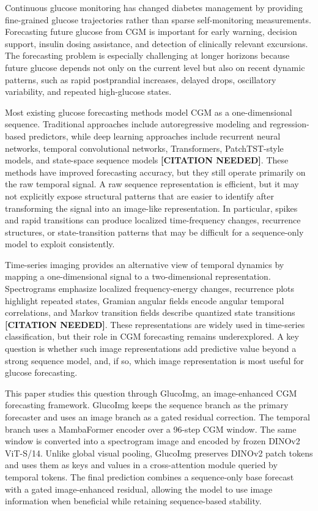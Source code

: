 \documentclass[11pt]{article}
\begin{document}
Continuous glucose monitoring has changed diabetes management by providing fine-grained glucose trajectories rather than sparse self-monitoring measurements. Forecasting future glucose from CGM is important for early warning, decision support, insulin dosing assistance, and detection of clinically relevant excursions. The forecasting problem is especially challenging at longer horizons because future glucose depends not only on the current level but also on recent dynamic patterns, such as rapid postprandial increases, delayed drops, oscillatory variability, and repeated high-glucose states.

Most existing glucose forecasting methods model CGM as a one-dimensional sequence. Traditional approaches include autoregressive modeling and regression-based predictors, while deep learning approaches include recurrent neural networks, temporal convolutional networks, Transformers, PatchTST-style models, and state-space sequence models \textbf{[CITATION NEEDED]}. These methods have improved forecasting accuracy, but they still operate primarily on the raw temporal signal. A raw sequence representation is efficient, but it may not explicitly expose structural patterns that are easier to identify after transforming the signal into an image-like representation. In particular, spikes and rapid transitions can produce localized time-frequency changes, recurrence structures, or state-transition patterns that may be difficult for a sequence-only model to exploit consistently.

Time-series imaging provides an alternative view of temporal dynamics by mapping a one-dimensional signal to a two-dimensional representation. Spectrograms emphasize localized frequency-energy changes, recurrence plots highlight repeated states, Gramian angular fields encode angular temporal correlations, and Markov transition fields describe quantized state transitions \textbf{[CITATION NEEDED]}. These representations are widely used in time-series classification, but their role in CGM forecasting remains underexplored. A key question is whether such image representations add predictive value beyond a strong sequence model, and, if so, which image representation is most useful for glucose forecasting.

This paper studies this question through GlucoImg, an image-enhanced CGM forecasting framework. GlucoImg keeps the sequence branch as the primary forecaster and uses an image branch as a gated residual correction. The temporal branch uses a MambaFormer encoder over a 96-step CGM window. The same window is converted into a spectrogram image and encoded by frozen DINOv2 ViT-S/14. Unlike global visual pooling, GlucoImg preserves DINOv2 patch tokens and uses them as keys and values in a cross-attention module queried by temporal tokens. The final prediction combines a sequence-only base forecast with a gated image-enhanced residual, allowing the model to use image information when beneficial while retaining sequence-based stability.
\end{document}
